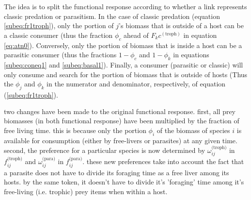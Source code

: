 \documentclass[11pt]{amsart}
\begin{document}
The idea is to split the functional response according to whether a link represents classic predation or parasitism.  In the case of classic predation (equation \ref{subeq:fr1troph}), only the portion of $j$'s biomass that is outside of a host can be a classic consumer (thus the fraction $\phi_c$ ahead of $F_kc^(\text{troph})$ in equation \ref{eq:atn0}).  Conversely, only the portion of biomass that is inside a host can be a parasitic consumer (thus the fractions $1-\phi_c$ and $1-\phi_k$ in equations \ref{subeq:coneq1} and \ref{subeq:basal1}).  Finally, a consumer (parasitic or classic) will only consume and search for the portion of biomass that is outside of hosts (Thus the $\phi_j$ and $\phi_k$ in the numerator and denominator, respectively, of equation (\ref{subeq:fr1troph}).

two changes have been made to the original functional response.  first, all prey biomasses (in both functional response) have been multiplied by the fraction of free living time.  this is because only the portion $\phi_i$ of the biomass of species $i$ is available for consumption (either by free-livers or parasites) at any given time.  second, the preference for a particular species is now determined by $\omega_{ij}^\text{(troph)}$ in $f_{ij}^\text{(troph)}$ and $\omega_{ij}^\text{(para)}$ in $f_{ij}^\text{(para)}$.  these new preferences take into account the fact that a parasite does not have to divide its foraging time as a free liver among its hosts.  by the same token, it doesn't have to divide it's 'foraging' time among it's free-living (i.e. trophic) prey items when within a host.
\end{document}
